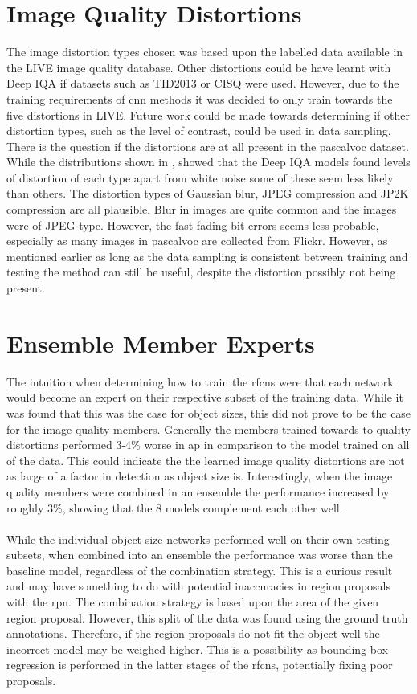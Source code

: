 \section{Image Quality Distortions}
The image distortion types chosen was based upon the labelled data available in the LIVE image quality database. Other distortions could be have learnt with Deep IQA if datasets such as TID2013 \cite{tid2013} or CISQ \cite{cisq} were used. However, due to the training requirements of \gls{cnn} methods it was decided to only train towards the five distortions in LIVE. Future work could be made towards determining if other distortion types, such as the level of contrast, could be used in data sampling. There is the question if the distortions are at all present in the \gls{pascalvoc} dataset. While the distributions shown in , showed that the Deep IQA models found levels of distortion of each type apart from white noise some of these seem less likely than others. The distortion types of Gaussian blur, JPEG compression and JP2K compression are all plausible. Blur in images are quite common and the images were of JPEG type. However, the fast fading bit errors seems less probable, especially as many images in \gls{pascalvoc} are collected from Flickr. However, as mentioned earlier as long as the data sampling is consistent between training and testing the method can still be useful, despite the distortion possibly not being present.

\section{Ensemble Member Experts}
The intuition when determining how to train the \glspl{rfcn} were that each network would become an expert on their respective subset of the training data. While it was found that this was the case for object sizes, this did not prove to be the case for the image quality members. Generally the members trained towards to quality distortions performed 3-4\% worse in \gls{ap} in comparison to the model trained on all of the data. This could indicate the the learned image quality distortions are not as large of a factor in detection as object size is. Interestingly, when the image quality members were combined in an ensemble the performance increased by roughly 3\%, showing that the 8 models complement each other well. 
\\\\
While the individual object size networks performed well on their own testing subsets, when combined into an ensemble the performance was worse than the baseline model, regardless of the combination strategy. This is a curious result and may have something to do with potential inaccuracies in region proposals with the \gls{rpn}. The combination strategy is based upon the area of the given region proposal. However, this split of the data was found using the ground truth annotations. Therefore, if the region proposals do not fit the object well the incorrect model may be weighed higher. This is a possibility as bounding-box regression is performed in the latter stages of the \glspl{rfcn}, potentially fixing poor proposals. 
